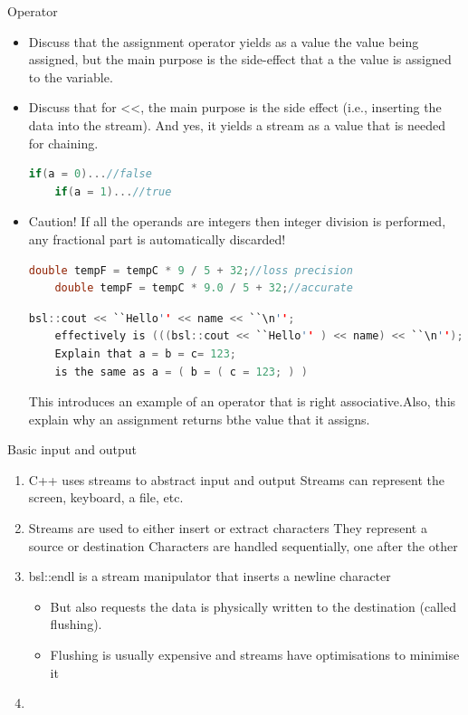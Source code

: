 \documentclass[a4paper]{tufte-handout}
\begin{document}
Operator
\begin{itemize}
\item Discuss that the assignment operator yields as a value the value being assigned, but the main purpose is the side-effect that a the value is assigned to the variable.
\item Discuss that for <<, the main purpose is the side effect (i.e., inserting the data into the stream). And yes, it yields a stream as a value that is needed for chaining.
  \begin{lstlisting}[language=C]
    if(a = 0)...//false
    if(a = 1)...//true
  \end{lstlisting}
\item Caution! If all the operands are integers then integer division is performed, any fractional part is automatically discarded!
  \begin{lstlisting}[language=C]
    double tempF = tempC * 9 / 5 + 32;//loss precision
    double tempF = tempC * 9.0 / 5 + 32;//accurate
  \end{lstlisting}
  \begin{lstlisting}[language=c]
    bsl::cout << ``Hello'' << name << ``\n'';
    effectively is (((bsl::cout << ``Hello'' ) << name) << ``\n'');
    Explain that a = b = c= 123;
    is the same as a = ( b = ( c = 123; ) )
  \end{lstlisting}
  This introduces an example of an operator that is right associative.Also, this explain why an assignment returns bthe value that it assigns.
\end{itemize}

Basic input and output

\begin{enumerate}
\item C++ uses streams to abstract input and output
  Streams can represent the screen, keyboard, a file, etc.
\item Streams are used to either insert or extract characters
  They represent a source or destination
  Characters are handled sequentially, one after the other
\item bsl::endl is a stream manipulator that inserts a newline character
  \begin{itemize}
  \item But also requests the data is physically written to the destination (called flushing).
  \item Flushing is usually expensive and streams have optimisations to minimise it
  \end{itemize}
\item
\end{enumerate}
\end{document}
